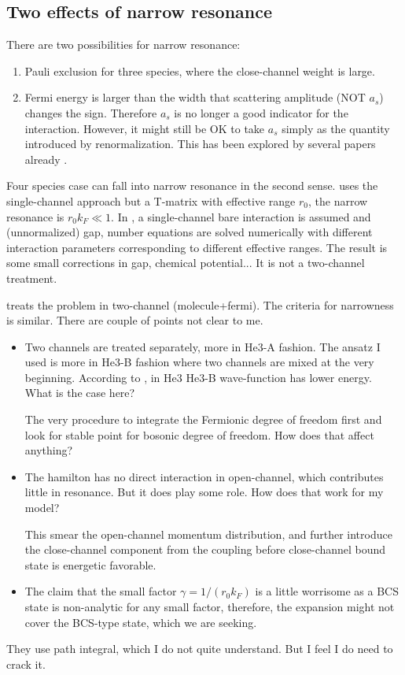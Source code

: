 \subsection{Two effects of narrow resonance}
There are two possibilities for narrow resonance:  
\begin{enumerate}
\item Pauli exclusion for three species, where the close-channel weight is large.  
\item Fermi energy is larger than the width that scattering amplitude (NOT $a_{s}$) changes the sign.  Therefore $a_{s}$ is no longer a good indicator for the interaction.  However, it might still be OK to take $a_{s}$ simply as the quantity introduced by renormalization.   This has been explored by several papers already \cite{NarrowJensen1,NarrowJensen,GurarieNarrow}.  
\end{enumerate}
Four species case can fall into narrow resonance in  the second sense.  \cite{NarrowJensen1,NarrowJensen} uses the single-channel approach but a T-matrix with effective range $r_{0}$, the narrow resonance is $r_{0}k_{F}\ll1$.  In \cite{NarrowJensen}, a single-channel bare interaction is assumed and (unnormalized) gap, number equations  are  solved numerically with different interaction parameters corresponding to different effective ranges. The result is some small corrections in gap, chemical potential...   It is not a two-channel treatment.  

\cite{GurarieNarrow} treats the problem in two-channel (molecule+fermi).  The criteria for narrowness is similar.  There are couple of points not clear to me.   
\begin{itemize}
\item Two channels are treated separately, more in He3-A fashion.  The ansatz I used is more in He3-B fashion where two channels are mixed at the very beginning.   According to \cite{He3B}, in He3 He3-B wave-function has lower energy.  What is the case here?

The very procedure to integrate the Fermionic degree of freedom first and look for stable point for bosonic degree of freedom.  How does that affect anything? 

\item The hamilton has no direct interaction in open-channel, which contributes little in resonance.  But it does play some role.  How does that work for my model? 

This smear the open-channel momentum distribution, and further introduce the close-channel component from the coupling before close-channel bound state is energetic favorable.  

\item The claim that the small factor $\gamma=1/(r_{0}k_{F})$ is a little worrisome as a BCS state is non-analytic for any small factor, therefore, the expansion might not cover the BCS-type state, which we are seeking.  
\end{itemize}
They use path integral, which I do not quite understand.  But I feel I do need to crack it.  

